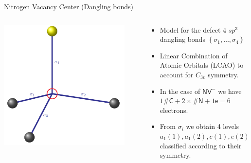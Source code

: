 \documentclass[notes=hide]{beamer}
\begin{document}
\begin{frame}{Nitrogen Vacancy Center (Dangling bonds)}
  \begin{columns}
    \begin{column}{0.5\textwidth}
\begin{center}
    \includegraphics[width=0.9\textwidth]{images/folien_dangling.png}
  \end{center}
    \end{column}
    \begin{column}{0.5\textwidth}
      \begin{itemize}
        \item Model for the defect 4 $ sp^{3} $ dangling bonds $ \left \{ \sigma _{1}, \ldots, \sigma _{4} \right \} $
        \item Linear Combination of Atomic Orbitals (LCAO) to
          account for $ C_{3v} $ symmetry.
        \item In the case of $ \mathsf{NV}^{-} $ we have
          $ 1 \# \mathsf{C} + 2\times \# \mathsf{N} + 1 \mathsf{e} = 6 $ electrons.
        \item From $ \sigma _{i} $ we obtain 4 levels $ a_1(1), a_1(2), e(1), e(2) $ classified according to their symmetry.

      \end{itemize}
    \end{column}
  \end{columns}
  
\end{frame}
\end{document}
